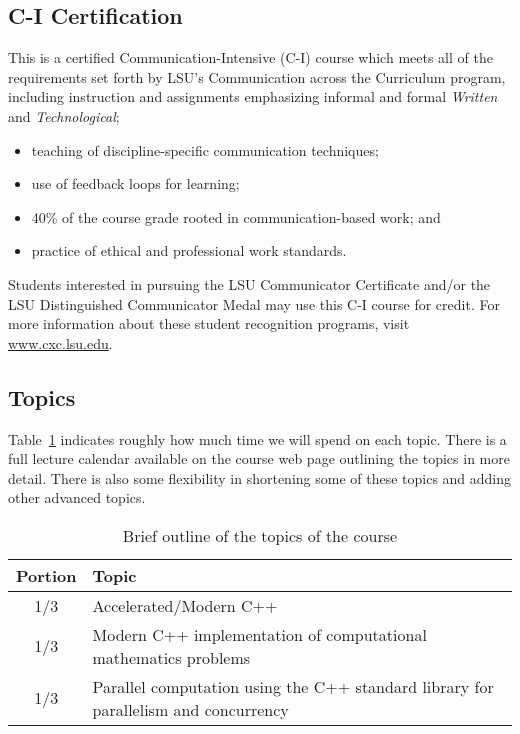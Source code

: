 \documentclass[11pt,letterpaper]{article}
\begin{document}
\subsection*{C-I Certification}
This is a certified Communication-Intensive (C-I) course which meets all of the requirements set forth by LSU’s Communication across the Curriculum program, including instruction and assignments emphasizing informal and formal \textit{Written} and \textit{Technological};
\begin{itemize}
\item teaching of discipline-specific communication techniques;
\item use of feedback loops for learning;
\item 40\% of the course grade rooted in communication-based work; and
\item practice of ethical and professional work standards.
\end{itemize}
Students interested in pursuing the LSU Communicator Certificate and/or the LSU Distinguished Communicator Medal may use this C-I course for credit. For more information about these student recognition programs, visit \url{www.cxc.lsu.edu}. 

\subsection*{Topics}

Table~\ref{tab:outline} indicates roughly how much time we will spend on each topic. There  is  a  full  lecture  calendar  available  on  the  course  web page  outlining  the  topics  in  more  detail. There  is  also some flexibility in shortening some of these topics and adding other advanced topics.

\begin{table}[b]
\centering
\begin{tabular}{cl}
\hline
Portion & Topic \\
\hline
1/3 & Accelerated/Modern C++\\
1/3 & Modern C++ implementation of computational mathematics problems \\
1/3 & Parallel computation using the C++ standard library for parallelism and concurrency \\
\hline
\end{tabular}
\caption{Brief outline of the topics of the course}
\label{tab:outline}
\end{table}
\end{document}
